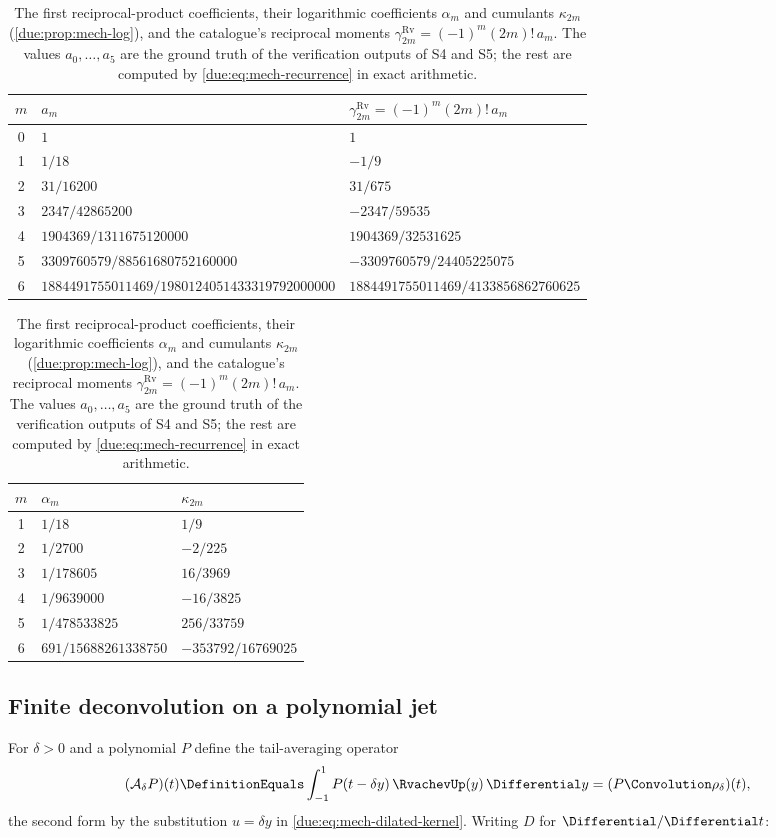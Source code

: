 \documentclass[11pt,oneside]{article}
\theoremstyle{plain}
\theoremstyle{definition}
\theoremstyle{remark}
\newcommand{\am}[1]{a_{#1}}                                 %
\begin{document}
\begin{table}[htbp]
\centering
\caption{The first reciprocal-product coefficients, their logarithmic
coefficients \(\alpha_m\) and cumulants \(\kappa_{2m}\)
(\cref{due:prop:mech-log}), and the catalogue's reciprocal moments
\(\gamma^{\mathrm{Rv}}_{2m}=(-1)^{m}(2m)!\,\am{m}\).  The values
\(\am{0},\ldots,\am{5}\) are the ground truth of the verification outputs of
S4 and S5; the rest are computed by \cref{due:eq:mech-recurrence} in exact
arithmetic.}
\label{due:tab:mech-am}
\footnotesize
\renewcommand{\arraystretch}{1.25}
\begin{tabular}{@{}c l l@{}}
\toprule
\(m\) & \(\am{m}\) & \(\gamma^{\mathrm{Rv}}_{2m}=(-1)^{m}(2m)!\,\am{m}\)\\
\midrule
0 & \(1\) & \(1\)\\
1 & \(1/18\) & \(-1/9\)\\
2 & \(31/16200\) & \(31/675\)\\
3 & \(2347/42865200\) & \(-2347/59535\)\\
4 & \(1904369/1311675120000\) & \(1904369/32531625\)\\
5 & \(3309760579/88561680752160000\) & \(-3309760579/24405225075\)\\
6 & \(1884491755011469/1980124051433319792000000\) & \(1884491755011469/4133856862760625\)\\
\bottomrule
\end{tabular}
\par\medskip
\begin{tabular}{@{}c l l@{}}
\toprule
\(m\) & \(\alpha_m\) & \(\kappa_{2m}\)\\
\midrule
1 & \(1/18\) & \(1/9\)\\
2 & \(1/2700\) & \(-2/225\)\\
3 & \(1/178605\) & \(16/3969\)\\
4 & \(1/9639000\) & \(-16/3825\)\\
5 & \(1/478533825\) & \(256/33759\)\\
6 & \(691/15688261338750\) & \(-353792/16769025\)\\
\bottomrule
\end{tabular}
\end{table}

\subsection{Finite deconvolution on a polynomial jet}

For \(\delta>0\) and a polynomial \(P\) define the tail-averaging operator
\begin{equation}
 (\mathcal A_\delta P)(t)\DefinitionEquals
 \int_{-1}^{1}P(t-\delta y)\,\RvachevUp(y)\,\Differential y
 =(P\Convolution\rho_\delta)(t),
 \label{due:eq:mech-averaging}
\end{equation}
the second form by the substitution \(u=\delta y\) in
\cref{due:eq:mech-dilated-kernel}.  Writing \(D\) for \(\Differential/\Differential t\):
\end{document}
